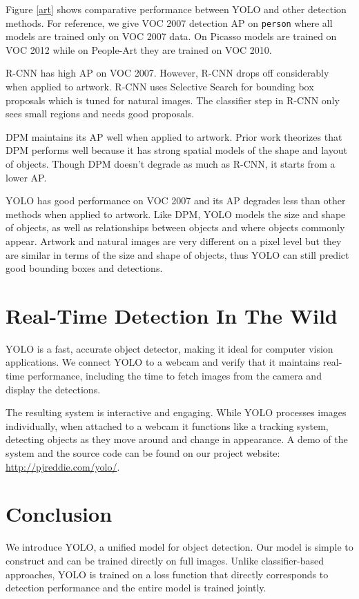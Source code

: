 Figure \ref{art} shows comparative performance between YOLO and other detection methods. For reference, we give VOC 2007 detection AP on \texttt{person} where all models are trained only on VOC 2007 data. On Picasso models are trained on VOC 2012 while on People-Art they are trained on VOC 2010.

R-CNN has high AP on VOC 2007. However, R-CNN drops off considerably when applied to artwork. R-CNN uses Selective Search for bounding box proposals which is tuned for natural images. The classifier step in R-CNN only sees small regions and needs good proposals.

DPM maintains its AP well when applied to artwork. Prior work theorizes that DPM performs well because it has strong spatial models of the shape and layout of objects. Though DPM doesn't degrade as much as R-CNN, it starts from a lower AP.

YOLO has good performance on VOC 2007 and its AP degrades less than other methods when applied to artwork. Like DPM, YOLO models the size and shape
of objects, as well as relationships between objects and where objects commonly appear. Artwork and natural images are very different on a pixel level but they are similar in terms of the size and shape of objects, thus YOLO can still predict good bounding boxes and detections.

\section{Real-Time Detection In The Wild}

YOLO is a fast, accurate object detector, making it ideal for computer vision applications. We connect YOLO to a webcam and verify that it maintains real-time performance, including the time to fetch images from the camera and display the detections.

The resulting system is interactive and engaging. While YOLO processes images individually, when attached to a webcam it functions like a tracking system, detecting objects as they move around and change in appearance. A demo of the system and the source code can be found on our project website: \url{http://pjreddie.com/yolo/}.

\section{Conclusion}

We introduce YOLO, a unified model for object detection. Our model is simple to construct and can be trained directly on full images. Unlike classifier-based approaches, YOLO is trained on a loss function that directly corresponds to detection performance and the entire model is trained jointly.


